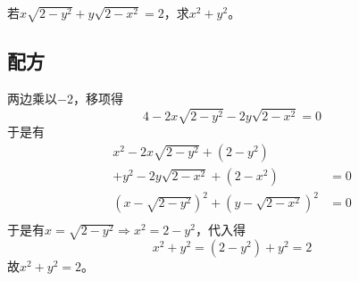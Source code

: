 

若$x\sqrt{2 - y^2} + y\sqrt{2 - x^2} = 2$，求$x^2 + y^2$。


\subsection{配方}

两边乘以$-2$，移项得
\[ 4 - 2x\sqrt{2 - y^2} - 2y\sqrt{2 - x^2} = 0 \]
于是有
\begin{align*}
  x^2 - 2x\sqrt{2 - y^2} + \left(2 - y^2\right) & \\
  + y^2 - 2y\sqrt{2 - x^2} + \left(2 - x^2\right) &= 0 \\
  \left(x - \sqrt{2 - y^2}\right)^2 + \left(y - \sqrt{2 - x^2}\right)^2 &= 0 \\
\end{align*}
于是有$x = \sqrt{2 - y^2} \Rightarrow x^2 = 2 - y^2$，代入得
\[ x^2 + y^2 = \left(2 - y^2\right) + y^2 = 2 \]
故$x^2 + y^2 = 2$。
